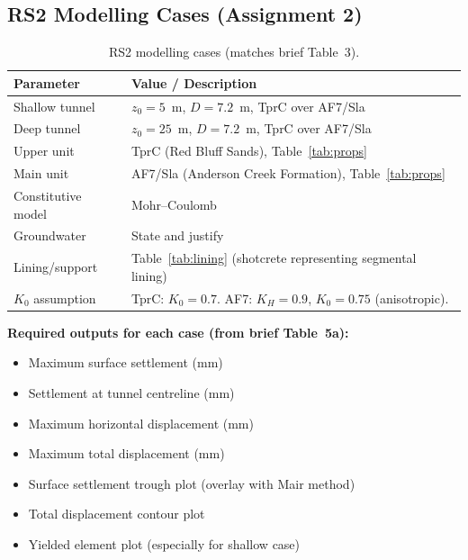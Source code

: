 \documentclass[a4paper,12pt]{article}
\begin{document}
\subsection{RS2 Modelling Cases (Assignment 2)}

\begin{table}[h!]
\centering
\begin{tabular}{l l}
\toprule
\textbf{Parameter} & \textbf{Value / Description} \\
\midrule
Shallow tunnel & $z_0 = 5$~m, $D = 7.2$~m, TprC over AF7/Sla \\
Deep tunnel & $z_0 = 25$~m, $D = 7.2$~m, TprC over AF7/Sla \\
Upper unit & TprC (Red Bluff Sands), Table~\ref{tab:props} \\
Main unit & AF7/Sla (Anderson Creek Formation), Table~\ref{tab:props} \\
Constitutive model & Mohr--Coulomb \\
Groundwater & State and justify \\
Lining/support & Table~\ref{tab:lining} (shotcrete representing segmental lining) \\
$K_0$ assumption & TprC: $K_0 = 0.7$. AF7: $K_H = 0.9$, $K_0 = 0.75$ (anisotropic). \\
\bottomrule
\end{tabular}
\caption{RS2 modelling cases (matches brief Table~3).}
\label{tab:rs2_cases}
\end{table}

\textbf{Required outputs for each case (from brief Table~5a):}
\begin{itemize}
    \item Maximum surface settlement (mm)
    \item Settlement at tunnel centreline (mm)
    \item Maximum horizontal displacement (mm)
    \item Maximum total displacement (mm)
    \item Surface settlement trough plot (overlay with Mair method)
    \item Total displacement contour plot
    \item Yielded element plot (especially for shallow case)
\end{itemize}

\end{document}
